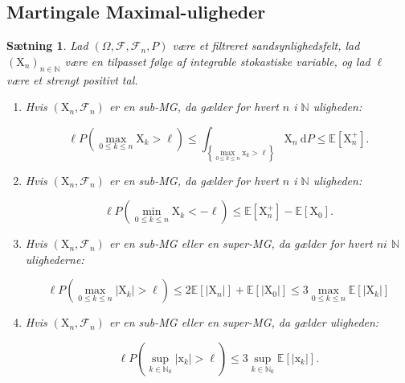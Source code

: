 \documentclass{article}
\newcommand{\1}{\mathbbm{1}}
\theoremstyle{boxed}
\newtheorem{proposition}[theorem]{Sætning}
\begin{document}
\subsection{Martingale Maximal-uligheder}
\begin{theorem-box}
    \begin{proposition}
        Lad $\left(\Omega, \mathcal{F}, \mathcal{F}_n, P\right)$ være et filtreret sandsynlighedsfelt, lad $\left(\mathrm{X}_n\right)_{n \in \mathbb{N}}$ være en tilpasset følge af integrable stokastiske variable, og lad $\ell$ være et strengt positivt tal.



        \begin{enumerate}
            \item[\textnormal{(i)}] Hvis $\left(\mathrm{X}_n, \mathcal{F}_n\right)$ er en sub-MG, da gælder for hvert $n$ i $\mathbb{N}$ uligheden:

            $$
            \ell P\left(\max _{0 \leq k \leq n} \mathrm{X}_k>\ell\right) \leq \int_{\left\{\max _{0 \leq k \leq n} \mathrm{x}_k>\ell\right\}} \mathrm{X}_n \mathrm{~d} P \leq \mathbb{E}\left[\mathrm{X}_n^{+}\right] .
            $$
            \item[\textnormal{(ii)}] Hvis $\left(\mathrm{X}_n, \mathcal{F}_n\right)$ er en sub-MG, da gælder for hvert $n$ i $\mathbb{N}$ uligheden:

            $$
            \ell P\left(\min _{0 \leq k \leq n} \mathrm{X}_k<-\ell\right) \leq \mathbb{E}\left[\mathrm{X}_n^{+}\right]-\mathbb{E}\left[\mathrm{X}_0\right] .
            $$
            \item[\textnormal{(iii)}] Hvis $\left(\mathrm{X}_n, \mathcal{F}_n\right)$ er en sub-MG eller en super-MG, da gælder for hvert $n i$ $\mathbb{N}$ ulighederne:

            $$
            \ell P\left(\max _{0 \leq k \leq n}\left|\mathrm{X}_k\right|>\ell\right) \leq 2 \mathbb{E}\left[\left|\mathrm{X}_n\right|\right]+\mathbb{E}\left[\left|\mathrm{X}_0\right|\right] \leq 3 \max _{0 \leq k \leq n} \mathbb{E}\left[\left|\mathrm{X}_k\right|\right]
            $$
                    
            \item[\textnormal{(iv)}]
            Hvis $\left(\mathrm{X}_n, \mathcal{F}_n\right)$ er en sub-MG eller en super-MG, da gælder uligheden:
            
            $$
            \ell P\left(\sup _{k \in \mathbb{N}_0}\left|\mathrm{x}_k\right|>\ell\right) \leq 3 \sup _{k \in \mathbb{N}_0} \mathbb{E}\left[\left|\mathrm{x}_k\right|\right] .
            $$
        \end{enumerate}
    \end{proposition}
\end{theorem-box}
\end{document}
